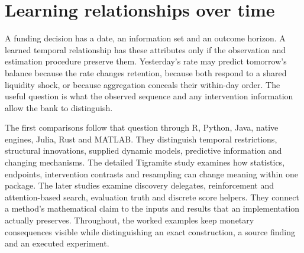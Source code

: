 \documentclass[11pt,a4paper,openany]{book}
\begin{document}






\chapter{Learning relationships over time}

A funding decision has a date, an information set and an outcome horizon.
A learned temporal relationship has these attributes only if the observation
and estimation procedure preserve them. Yesterday's rate may predict tomorrow's
balance because the rate changes retention, because both respond to a shared
liquidity shock, or because aggregation conceals their within-day order. The
useful question is what the observed sequence and any intervention information
allow the bank to distinguish.

The first comparisons follow that question through R, Python, Java, native
engines, Julia, Rust and MATLAB. They distinguish temporal restrictions,
structural innovations, supplied dynamic models, predictive information and
changing mechanisms. The detailed Tigramite study examines how statistics,
endpoints, intervention contrasts and resampling can change meaning within
one package. The later studies examine discovery delegates, reinforcement and
attention-based search, evaluation truth and discrete score helpers. They
connect a method's mathematical claim to the inputs and results that an
implementation actually preserves. Throughout, the worked examples keep
monetary consequences visible while distinguishing an exact construction,
a source finding and an executed experiment.
\end{document}
